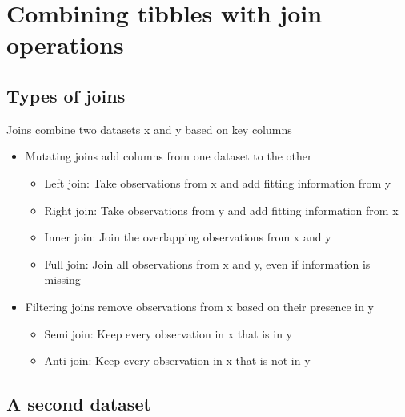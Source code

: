 \documentclass[
  letterpaper,
]{book}
\providecommand{\tightlist}{%
  \setlength{\itemsep}{0pt}\setlength{\parskip}{0pt}}\usepackage{longtable,booktabs,array}
\begin{document}
\hypertarget{combining-tibbles-with-join-operations}{%
\section{Combining tibbles with join
operations}\label{combining-tibbles-with-join-operations}}

\hypertarget{types-of-joins}{%
\subsection{Types of joins}\label{types-of-joins}}

Joins combine two datasets x and y based on key columns

\begin{itemize}
\tightlist
\item
  Mutating joins add columns from one dataset to the other

  \begin{itemize}
  \tightlist
  \item
    Left join: Take observations from x and add fitting information from
    y
  \item
    Right join: Take observations from y and add fitting information
    from x
  \item
    Inner join: Join the overlapping observations from x and y
  \item
    Full join: Join all observations from x and y, even if information
    is missing
  \end{itemize}
\item
  Filtering joins remove observations from x based on their presence in
  y

  \begin{itemize}
  \tightlist
  \item
    Semi join: Keep every observation in x that is in y
  \item
    Anti join: Keep every observation in x that is not in y
  \end{itemize}
\end{itemize}

\hypertarget{a-second-dataset}{%
\subsection{A second dataset}\label{a-second-dataset}}
\end{document}
